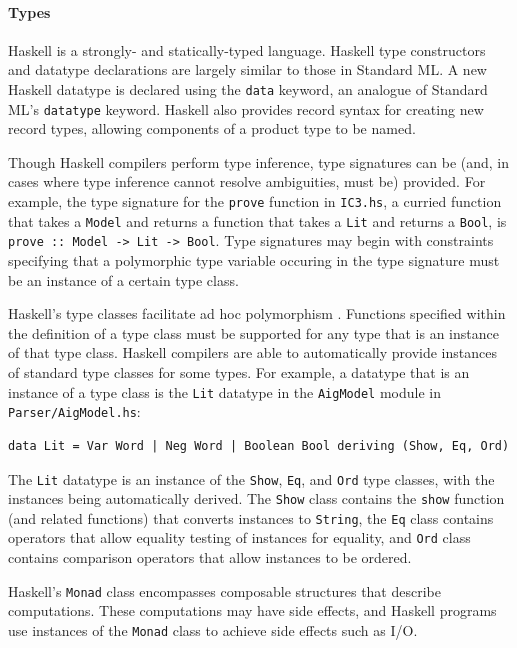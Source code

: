 \documentclass[12pt,a4paper,twoside,openright]{report}
\begin{document}
\paragraph{Types}{
Haskell is a strongly- and statically-typed language.
Haskell type constructors and datatype declarations are largely similar to those in
Standard ML. A new Haskell datatype is declared using the \verb,data, keyword, an analogue
of Standard ML's \verb,datatype, keyword.
Haskell also provides record syntax for creating new record types, allowing components
of a product type to be named.

Though Haskell compilers perform type inference, type
signatures can be (and, in cases where type inference cannot resolve
ambiguities, must be) provided. For example, the type signature for
the \verb,prove, function in \verb,IC3.hs,, a curried function that takes
a \verb,Model, and returns a function that takes a \verb,Lit, and returns a \verb,Bool,,
is \verb,prove :: Model -> Lit -> Bool,. Type signatures may begin with
constraints specifying that a polymorphic type variable occuring in the type
signature must be an instance of a certain type class.


Haskell's type classes facilitate ad hoc polymorphism \cite{hall94}.
Functions specified within the definition of a type class
must be supported for any type that is an instance of that type class.
Haskell compilers are able to automatically provide instances of standard
type classes for some types.
For example, a datatype that is an instance of a type class is the \verb,Lit, datatype
in the \verb,AigModel, module in \verb,Parser/AigModel.hs,:
\begin{lstlisting}
data Lit = Var Word | Neg Word | Boolean Bool deriving (Show, Eq, Ord)
\end{lstlisting}
The \verb,Lit, datatype is an instance of the \verb,Show,, \verb,Eq,, and
\verb,Ord, type classes, with the instances being automatically derived.
The \verb,Show, class contains the \verb,show, function (and related functions) that
converts instances to \verb,String,, the \verb,Eq, class contains
operators that allow equality testing of instances for
equality, and \verb,Ord, class contains comparison operators
that allow instances to be ordered.

Haskell's \verb,Monad, class encompasses composable
structures that describe computations. These computations
may have side effects, and Haskell programs use instances of the
\verb,Monad, class to achieve side effects such as I/O.

}
\end{document}
